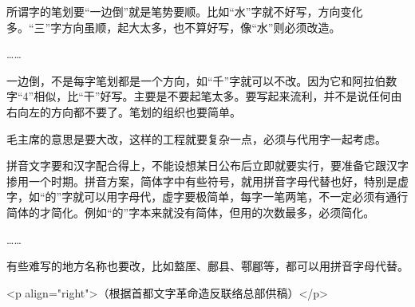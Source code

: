 所谓字的笔划要“一边倒”就是笔势要顺。比如“水”字就不好写，方向变化多。“三”字方向虽顺，起大太多，也不算好写，像“水”则必须改造。

……

一边倒，不是每字笔划都是一个方向，如“千”字就可以不改。因为它和阿拉伯数字“4”相似，比“干”好写。主要是不要起笔太多。要写起来流利，并不是说任何由右向左的方向都不要了。笔划的组织也要简单。

毛主席的意思是要大改，这样的工程就要复杂一点，必须与代用字一起考虑。

拼音文字要和汉字配合得上，不能设想某日公布后立即就要实行，要准备它跟汉字掺用一个时期。拼音方案，简体字中有些符号，就用拼音字母代替也好，特别是虚字，如“的”字就可以用字母代，虚字要极简单，每字一笔两笔，不一定必须有通行简体的才简化。例如“的”字本来就没有简体，但用的次数最多，必须简化。

……

有些难写的地方名称也要改，比如盩厔、鄜县、鄠郿等，都可以用拼音字母代替。

<p align="right">（根据首都文字革命造反联络总部供稿）</p>


